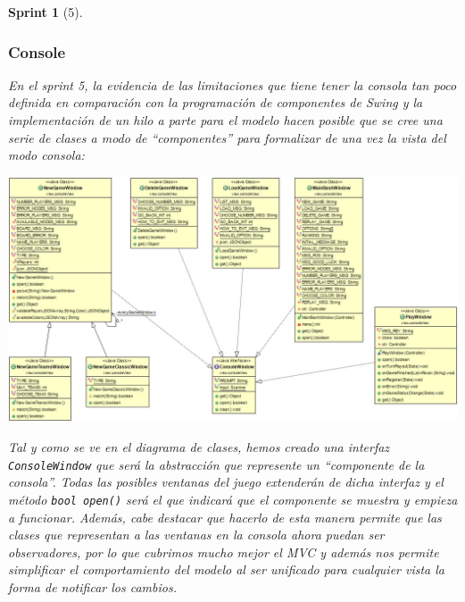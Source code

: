 \documentclass{article}
\theoremstyle{break}
\newtheorem*{sprint}{Sprint}
\begin{document}
\begin{sprint}[5]
\subsubsection{Console}
En el sprint 5, la evidencia de las limitaciones que tiene tener la consola tan poco definida en comparación con la programación de componentes de \textit{Swing} y la implementación de un hilo a parte para el modelo hacen posible que se cree una serie de clases a modo de ``componentes'' para formalizar de una vez la vista del modo consola:
\begin{center}
\includegraphics[scale=0.55, angle=90]{DiagramaClasesConsola}
\end{center}
Tal y como se ve en el diagrama de clases, hemos creado una interfaz \texttt{ConsoleWindow} que será la abstracción que represente un ``componente de la consola''. Todas las posibles ventanas del juego extenderán de dicha interfaz y el método \texttt{bool open()} será el que indicará que el componente se muestra y empieza a funcionar. Además, cabe destacar que hacerlo de esta manera permite que las clases que representan a las ventanas en la consola ahora puedan ser observadores, por lo que cubrimos mucho mejor el \textit{MVC} y además nos permite simplificar el comportamiento del modelo al ser unificado para cualquier vista la forma de notificar los cambios.


\end{sprint}
\end{document}
